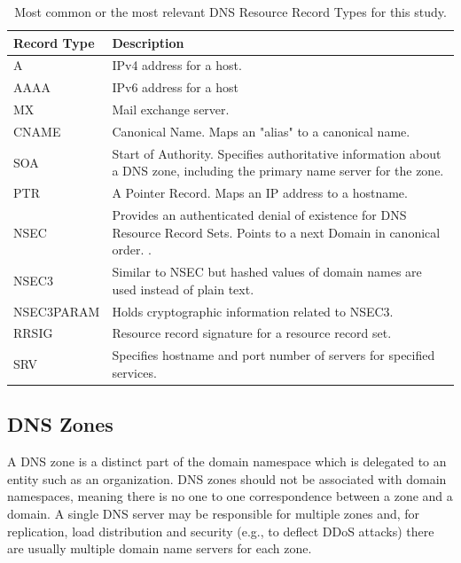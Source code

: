 \begin{table}[th]
\caption{Most common or the most relevant DNS Resource Record Types for this study.}
\label{table:dns_record_types}
\begin{center}
\begin{tabular}{|p{}|p{}|} 
    \hline
\textsf{Record Type} & \textsf{Description} \\
    \hline
    \hline
A & IPv4 address for a host. \cite{RFC1035}\\ 
    \hline
AAAA & IPv6 address for a host \cite{RFC3596}\\
    \hline
MX & Mail exchange server. \cite{RFC1035} \\
    \hline
CNAME & Canonical Name. Maps an "alias" to a canonical name. \cite{RFC1035} \\
    \hline
SOA & Start of Authority. Specifies authoritative information about a DNS zone, including the primary name server for the zone. \cite{RFC1035}\\    \hline
PTR & A Pointer Record. Maps an IP address to a hostname. \cite{RFC1035} \\
    \hline
    
NSEC & Provides an authenticated denial of
   existence for DNS Resource Record Sets. Points to a next Domain in canonical order. \cite{RFC3845}. 
\\
\hline
NSEC3 & Similar to NSEC but hashed values of domain names are used instead of plain text. \cite{RFC5155} \\
\hline

NSEC3PARAM & Holds cryptographic information related to NSEC3. \cite{RFC5155}\\
\hline

RRSIG & Resource record signature for a resource record set. \cite{RFC4034}\\
\hline

SRV & Specifies hostname and port number of servers for specified services. \cite{RFC2782}\\
\hline


\end{tabular}
\end{center}
\end{table}


\subsection{DNS Zones}
\label{sec:dns_zones}

A \textsf{DNS zone} is a distinct part of the domain namespace which is delegated to an entity such as an organization. DNS zones should not be associated with domain namespaces, meaning there is no one to one correspondence between a zone and a domain. A single DNS server may be responsible for multiple zones and, for replication, load distribution and security (e.g., to deflect DDoS attacks) there are usually multiple domain name servers for each zone. \citep{tanenbaum}

